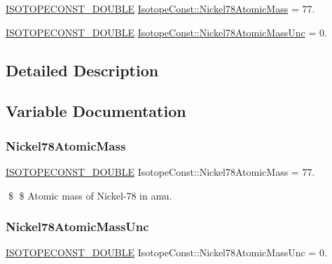 \begin{DoxyCompactItemize}
\item 
\mbox{\hyperlink{group___isotope_const-_macros_ga8f45a7272ce02c0b4c65c44636ed719a}{I\+S\+O\+T\+O\+P\+E\+C\+O\+N\+S\+T\+\_\+\+D\+O\+U\+B\+LE}} \mbox{\hyperlink{group___isotope_const-_nickel-_ni78_gab9936e84f5403c24677523c8223103e1}{Isotope\+Const\+::\+Nickel78\+Atomic\+Mass}} = 77.
\item 
\mbox{\hyperlink{group___isotope_const-_macros_ga8f45a7272ce02c0b4c65c44636ed719a}{I\+S\+O\+T\+O\+P\+E\+C\+O\+N\+S\+T\+\_\+\+D\+O\+U\+B\+LE}} \mbox{\hyperlink{group___isotope_const-_nickel-_ni78_ga8862bd4021010186ab94cc5cbd366dab}{Isotope\+Const\+::\+Nickel78\+Atomic\+Mass\+Unc}} = 0.
\end{DoxyCompactItemize}


\subsection{Detailed Description}


\subsection{Variable Documentation}
\mbox{\label{group___isotope_const-_nickel-_ni78_gab9936e84f5403c24677523c8223103e1}} 
\subsubsection{\texorpdfstring{Nickel78\+Atomic\+Mass}{Nickel78AtomicMass}}
{\footnotesize\ttfamily \mbox{\hyperlink{group___isotope_const-_macros_ga8f45a7272ce02c0b4c65c44636ed719a}{I\+S\+O\+T\+O\+P\+E\+C\+O\+N\+S\+T\+\_\+\+D\+O\+U\+B\+LE}} Isotope\+Const\+::\+Nickel78\+Atomic\+Mass = 77.}

\$ \$ Atomic mass of Nickel-\/78 in amu. \mbox{\label{group___isotope_const-_nickel-_ni78_ga8862bd4021010186ab94cc5cbd366dab}} 
\subsubsection{\texorpdfstring{Nickel78\+Atomic\+Mass\+Unc}{Nickel78AtomicMassUnc}}
{\footnotesize\ttfamily \mbox{\hyperlink{group___isotope_const-_macros_ga8f45a7272ce02c0b4c65c44636ed719a}{I\+S\+O\+T\+O\+P\+E\+C\+O\+N\+S\+T\+\_\+\+D\+O\+U\+B\+LE}} Isotope\+Const\+::\+Nickel78\+Atomic\+Mass\+Unc = 0.}

